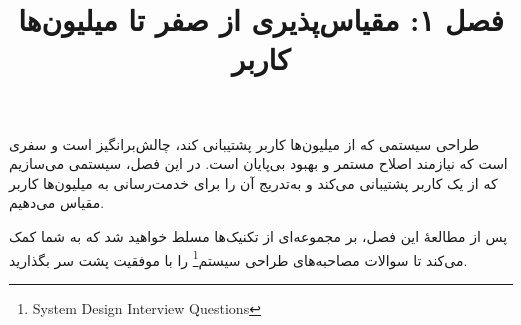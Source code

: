 \documentclass[12pt,a4paper]{article}
\title{فصل ۱: مقیاس‌پذیری از صفر تا میلیون‌ها کاربر}
\author{}
\date{}
\begin{document}
\maketitle

طراحی سیستمی که از میلیون‌ها کاربر پشتیبانی کند، چالش‌برانگیز است و سفری است که نیازمند اصلاح مستمر و بهبود بی‌پایان است. در این فصل، سیستمی می‌سازیم که از یک کاربر پشتیبانی می‌کند و به‌تدریج آن را برای خدمت‌رسانی به میلیون‌ها کاربر مقیاس می‌دهیم.

پس از مطالعهٔ این فصل، بر مجموعه‌ای از تکنیک‌ها مسلط خواهید شد که به شما کمک می‌کند تا سوالات مصاحبه‌های طراحی سیستم\footnote{System Design Interview Questions} را با موفقیت پشت سر بگذارید.
\end{document}
